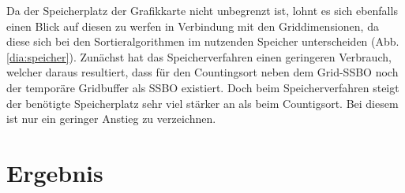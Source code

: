 \documentclass[intern,palatino]{cgBA}
\begin{document}
Da der Speicherplatz der Grafikkarte nicht unbegrenzt ist, lohnt es sich ebenfalls einen Blick auf diesen zu werfen in Verbindung mit den Griddimensionen, da diese sich bei den Sortieralgorithmen im nutzenden Speicher unterscheiden (Abb.\ref{dia:speicher}).
\newline
Zunächst hat das Speicherverfahren einen geringeren Verbrauch, welcher daraus resultiert, dass für den Countingsort neben dem Grid-SSBO noch der temporäre Gridbuffer als SSBO existiert. Doch beim Speicherverfahren steigt der benötigte Speicherplatz sehr viel stärker an als beim Countigsort. Bei diesem ist nur ein geringer Anstieg zu verzeichnen.

\newpage

\section{Ergebnis}\label{ergebnis}
\end{document}
